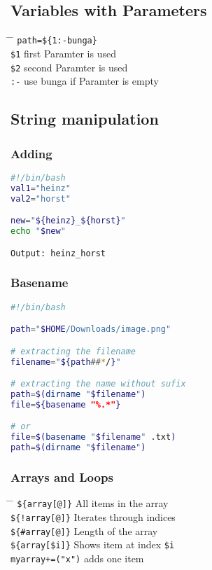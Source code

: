 \documentclass[a4paper,10pt]{article}
\begin{document}
\subsection{Variables with Parameters}
\begin{tabbing}
	\= \hspace{30mm} \= \hspace{50mm} \kill
	\> \verb|path=${1:-bunga}| \\
	\> \verb|$1| \> first Paramter is used \\
	\> \verb|$2| \> second Paramter is used \\
	\> \verb|:-| \> use bunga if Paramter is empty \\
\end{tabbing}

\subsection{String manipulation}
\subsubsection{Adding}
\begin{lstlisting}[language=bash]
#!/bin/bash 
val1="heinz"
val2="horst"

new="${heinz}_${horst}"
echo "$new"

Output: heinz_horst
\end{lstlisting}

\subsubsection{Basename}
\begin{lstlisting}[language=bash]
#!/bin/bash 

path="$HOME/Downloads/image.png"

# extracting the filename 
filename="${path##*/}" 

# extracting the name without sufix 
path=$(dirname "$filename")
file=${basename "%.*"} 

# or 
file=$(basename "$filename" .txt)
path=$(dirname "$filename")
\end{lstlisting}

\subsubsection*{Arrays and Loops}
\begin{tabbing}
	\= \hspace{30mm} \= \hspace{50mm} \kill
	\> \verb|${array[@]}| \> All items in the array \\
	\> \verb|${!array[@]}| \> Iterates through indices \\
	\> \verb|${#array[@]}| \> Length of the array \\
	\> \verb|${array[$i]}| \> Shows item at index \verb|$i| \\
	\> \verb|myarray+=("x")| \> adds one item \\
\end{tabbing}
\end{document}

